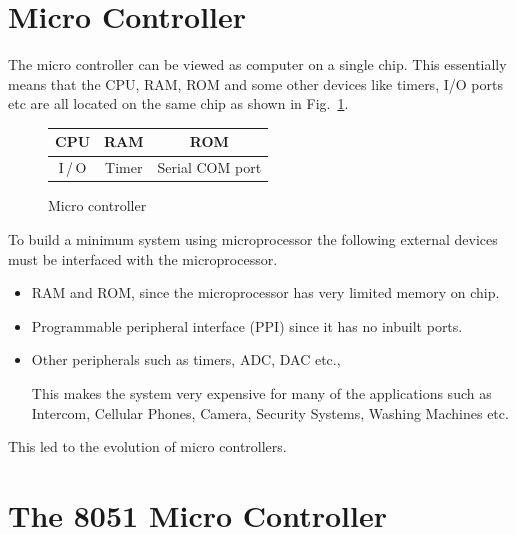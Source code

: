 \section{Micro Controller}\label{sec7.11}

The micro controller can be viewed as computer on a single chip. This essentially means that the CPU, RAM, ROM and some other devices like timers, I/O ports etc are all located on the same chip as shown in Fig.~\ref{fig7.6}.
\begin{figure}[H]
\centering
\caption{Micro controller}\label{fig7.6}
\tabcolsep=10pt
\renewcommand{\arraystretch}{2}
\begin{tabular}{|c|c|c|}
\hline
CPU & RAM & ROM\\
\hline 
I\,/\,O & Timer & Serial COM port\\
\hline
\end{tabular}
\end{figure}

\newpage


\smallskip

To build a minimum system using microprocessor the following external devices must be interfaced with the microprocessor.
\begin{itemize}
\item RAM and ROM, since the microprocessor has very limited memory on chip.

\item Programmable peripheral interface (PPI) since it has no inbuilt ports.

\item Other peripherals such as timers, ADC, DAC etc.,  

This makes the system very expensive for many of the applications such as Intercom, Cellular Phones, Camera, Security Systems, Washing Machines etc.
\end{itemize}
This led to the evolution of micro controllers.

\section{The 8051 Micro Controller}\label{sec7.12}

